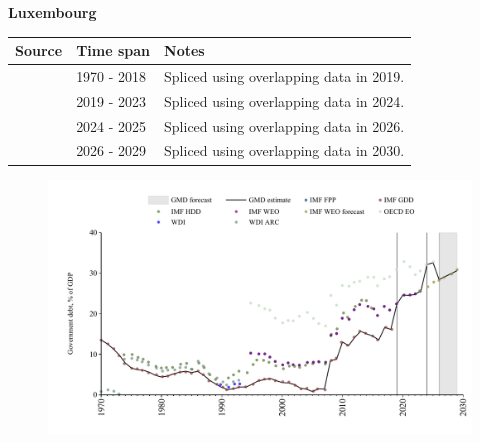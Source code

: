 \documentclass[12pt,a4paper,landscape]{article}
\begin{document}
\begin{adjustbox}{max totalsize={\paperwidth}{\paperheight},center}
\begin{minipage}[t][\textheight][t]{\textwidth}
\vspace*{0.5cm}
{}
\begin{center}
{\Large\bfseries Luxembourg}
\end{center}
\vspace{0.5cm}
\begin{table}[H]
\centering
\small
\begin{tabular}{|l|l|l|}
\hline
\textbf{Source} & \textbf{Time span} & \textbf{Notes} \\
\hline
\rowcolor{white}\cite{IMF_GDD}& 1970 - 2018 &Spliced using overlapping data in 2019.\\
\rowcolor{lightgray}\cite{IMF_FPP}& 2019 - 2023 &Spliced using overlapping data in 2024.\\
\rowcolor{white}\cite{OECD_EO}& 2024 - 2025 &Spliced using overlapping data in 2026.\\
\rowcolor{lightgray}\cite{IMF_WEO_forecast}& 2026 - 2029 &Spliced using overlapping data in 2030.\\
\hline
\end{tabular}
\end{table}
\begin{figure}[H]
\centering
\includegraphics[width=\textwidth,height=0.6\textheight,keepaspectratio]{graphs/LUX_govdebt_GDP.pdf}
\end{figure}
\end{minipage}
\end{adjustbox}
\end{document}
